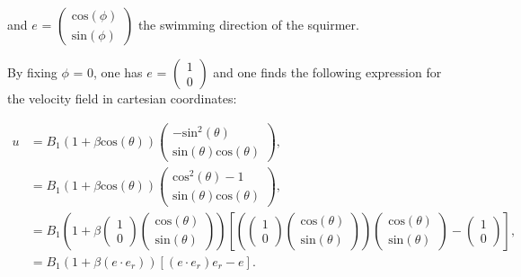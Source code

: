 \documentclass[options]{article}
\begin{document}
and $e$ = 
$\begin{pmatrix}
   \mathrm{cos}(\phi) \\
   \mathrm{sin}(\phi) \end{pmatrix}$ the swimming direction of the squirmer. 
   
   By fixing $\phi$ = 0, one has $e$ = $\begin{pmatrix}
   1 \\
   0 \end{pmatrix}$ and one finds the following expression for the velocity field 
   in cartesian coordinates: 

\begin{align*}
u &= B_1 \left(1+\beta \mathrm{cos}(\theta) \right) \begin{pmatrix}
   -\mathrm{sin}^2(\theta) \\
   \mathrm{sin}(\theta)\mathrm{cos}(\theta)
\end{pmatrix},  \\
&= B_1 \left(1+\beta \mathrm{cos}(\theta) \right) \begin{pmatrix}
   \mathrm{cos}^2(\theta)-1 \\
   \mathrm{sin}(\theta)\mathrm{cos}(\theta)
\end{pmatrix}, \\
&= B_1 \left(1+\beta \begin{pmatrix}
   1 \\
   0 \end{pmatrix}\begin{pmatrix}
   \mathrm{cos}(\theta) \\
   \mathrm{sin}(\theta)
\end{pmatrix}\right) \left[ \left( \begin{pmatrix}
   1 \\
   0 \end{pmatrix}\begin{pmatrix}
   \mathrm{cos}(\theta) \\
   \mathrm{sin}(\theta)
\end{pmatrix}\right) \begin{pmatrix}
   \mathrm{cos}(\theta) \\
   \mathrm{sin}(\theta)
\end{pmatrix} - \begin{pmatrix}
   1 \\
   0 \end{pmatrix}\right], \\
&= B_1(1+\beta (e \cdot e_r)) [(e \cdot e_r)e_r - e]. 

\end{align*}
\end{document}
